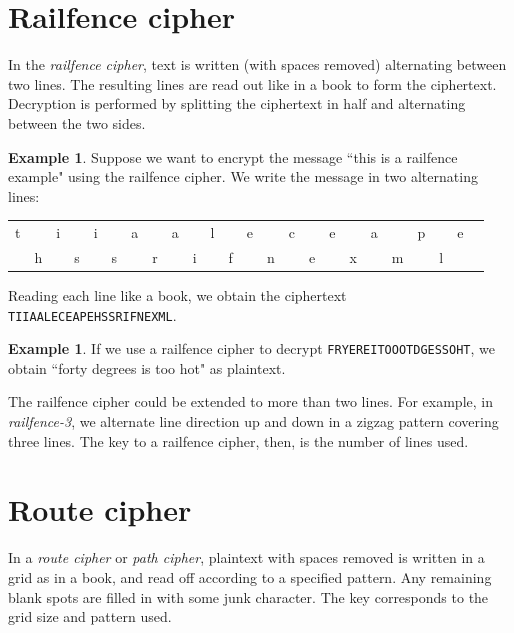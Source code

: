 \documentclass{book}
\theoremstyle{plain}
\theoremstyle{definition}
\newtheorem{example}[theorem]{Example}
\newcommand{\ciphertext}[1]{\texttt{#1}} %
\begin{document}
\section{Railfence cipher}
In the {\it railfence cipher}, text is written (with spaces removed) alternating between two lines. The resulting lines are read out like in a book to form the ciphertext. Decryption is performed by splitting the ciphertext in half and alternating between the two sides.

\begin{example}
Suppose we want to encrypt the message ``this is a railfence example" using the railfence cipher. We write the message in two alternating lines:
\begin{center}
\begin{tabular}{cccccccccccccccccccccccc}
t && i && i && a && a && l && e && c && e && a && p && e \\
& h && s && s && r && i && f && n && e && x && m && l
\end{tabular}
\end{center}
Reading each line like a book, we obtain the ciphertext \ciphertext{TIIAALECEAPEHSSRIFNEXML}.
\end{example}

\begin{example}
If we use a railfence cipher to decrypt \ciphertext{FRYEREITOOOTDGESSOHT}, we obtain ``forty degrees is too hot" as plaintext.
\end{example}

The railfence cipher could be extended to more than two lines. For example, in {\it railfence-3}, we alternate line direction up and down in a zigzag pattern covering three lines. The key to a railfence cipher, then, is the number of lines used.

\section{Route cipher}
In a {\it route cipher} or {\it path cipher}, plaintext with spaces removed is written in a grid as in a book, and read off according to a specified pattern. Any remaining blank spots are filled in with some junk character. The key corresponds to the grid size and pattern used.
\end{document}
